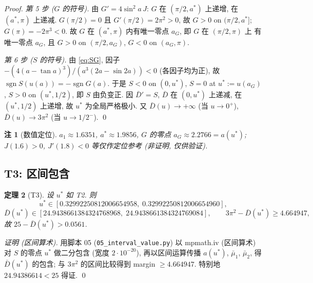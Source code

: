 \documentclass[UTF8]{ctexart}
\newtheorem{theorem}{定理}[section]
\newtheorem{remark}[theorem]{注}
\begin{document}
\begin{proof}
\emph{第 5 步 ($G$ 的符号).} 由 $G'=4\sin^2a\,J$: $G$ 在 $(\pi/2,a^*)$ 上递增,
在 $(a^*,\pi)$ 上递减. $G(\pi/2)=0$ 且 $G'(\pi/2)=2\pi^2>0$, 故 $G>0$ on $(\pi/2,a^*]$;
$G(\pi)=-2\pi^3<0$. 故 $G$ 在 $(a^*,\pi)$ 内有唯一零点 $a_G$, 即 $G$ 在 $(\pi/2,\pi)$ 上
有唯一零点 $a_G$, 且 $G>0$ on $(\pi/2,a_G)$, $G<0$ on $(a_G,\pi)$.

\emph{第 6 步 ($S$ 的符号).} 由 \eqref{eq:SG}, 因子 $-(4(a-\tan a)^3)/(a^3(2a-\sin2a))<0$
(各因子均为正), 故 $\operatorname{sgn}S(u(a))=-\operatorname{sgn}G(a)$. 于是
$S<0$ on $(0,u^*)$, $S=0$ at $u^*:=u(a_G)$, $S>0$ on $(u^*,1/2)$,
即 $S$ 由负变正. 因 $\bar D'=S$, $\bar D$ 在 $(0,u^*)$ 上递减, 在 $(u^*,1/2)$ 上递增,
故 $u^*$ 为全局严格极小. 又 $\bar D(u)\to+\infty$ (当 $u\to0^+$),
$\bar D(u)\to3\pi^2$ (当 $u\to1/2^-$). \qed
\end{proof}

\begin{remark}[数值定位]
$a_1\approx1.6351$, $a^*\approx1.9856$, $G$ 的零点 $a_G\approx2.2766=a(u^*)$;
$J(1.6)>0$, $J'(1.8)<0$ 等仅作定位参考 (非证明, 仅供验证).
\end{remark}

\subsection{T3: 区间包含}\label{sec:T3}
\begin{theorem}[T3]\label{thm:T3}
设 $u^*$ 如 T2. 则
\begin{equation}
	u^*\in[0.32992250812006654958,\;0.32992250812006654960],
\end{equation}
\begin{equation}
	\bar D(u^*)\in[24.9438661384324768968,\;24.9438661384324769084],
	\qquad
	3\pi^2-\bar D(u^*)\ge4.664947,
\end{equation}
故 $25-\bar D(u^*)>0.0561$.
\end{theorem}
\begin{proof}[证明 (区间算术)]
用脚本 05 (\texttt{05\_interval\_value.py}) 以 mpmath.iv (区间算术) 对 $S$ 的零点
$u^*$ 做二分包含 (宽度 $2\cdot10^{-20}$), 再以区间运算传播
$a(u^*)$, $\bar\mu_1$, $\bar\mu_2$, 得 $\bar D(u^*)$ 的包含; 与 $3\pi^2$ 的区间比较得到
margin $\ge4.664947$. 特别地 $24.94386614<25$ 得证. \qed
\end{proof}
\end{document}
